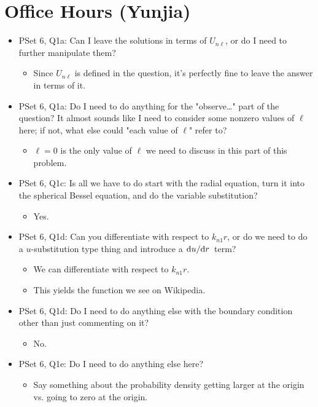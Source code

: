 \documentclass[../notes.tex]{subfiles}
\begin{document}
\section{Office Hours (Yunjia)}
\begin{itemize}
    \item {}PSet 6, Q1a: Can I leave the solutions in terms of $U_{n\ell}$, or do I need to further manipulate them?
    \begin{itemize}
        \item Since $U_{n\ell}$ is defined in the question, it's perfectly fine to leave the answer in terms of it.
    \end{itemize}
    \item PSet 6, Q1a: Do I need to do anything for the "observe\dots" part of the question? It almost sounds like I need to consider some nonzero values of $\ell$ here; if not, what else could "each value of $\ell$" refer to?
    \begin{itemize}
        \item $\ell=0$ is the only value of $\ell$ we need to discuss in this part of this problem.
    \end{itemize}
    \item PSet 6, Q1c: Is all we have to do start with the radial equation, turn it into the spherical Bessel equation, and do the variable substitution?
    \begin{itemize}
        \item Yes.
    \end{itemize}
    \item PSet 6, Q1d: Can you differentiate with respect to $k_{n1}r$, or do we need to do a $u$-substitution type thing and introduce a $\dv*{u}{r}$ term?
    \begin{itemize}
        \item We can differentiate with respect to $k_{n1}r$.
        \item This yields the function we see on Wikipedia.
    \end{itemize}
    \item PSet 6, Q1d: Do I need to do anything else with the boundary condition other than just commenting on it?
    \begin{itemize}
        \item No.
    \end{itemize}
    \item PSet 6, Q1e: Do I need to do anything else here?
    \begin{itemize}
        \item Say something about the probability density getting larger at the origin vs. going to zero at the origin.

\end{itemize}
\end{itemize}
\end{document}
